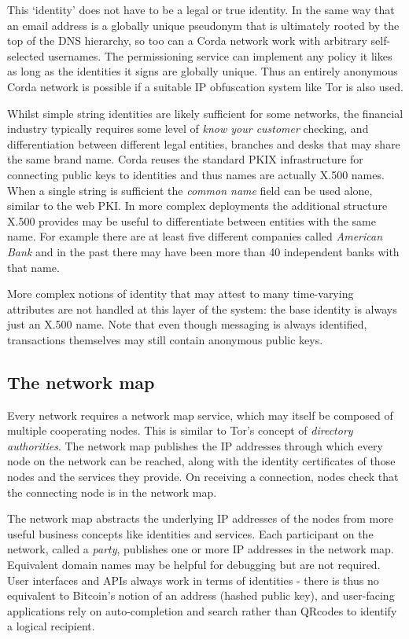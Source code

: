 \documentclass{article}
\begin{document}
This `identity' does not have to be a legal or true identity. In the same way that an email address is a globally
unique pseudonym that is ultimately rooted by the top of the DNS hierarchy, so too can a Corda network work with
arbitrary self-selected usernames. The permissioning service can implement any policy it likes as long as the
identities it signs are globally unique. Thus an entirely anonymous Corda network is possible if a suitable
IP obfuscation system like Tor is also used.

Whilst simple string identities are likely sufficient for some networks, the financial industry typically requires some
level of \emph{know your customer} checking, and differentiation between different legal entities, branches and desks
that may share the same brand name. Corda reuses the standard PKIX infrastructure for connecting public keys to
identities and thus names are actually X.500 names. When a single string is sufficient the \emph{common name} field can
be used alone, similar to the web PKI. In more complex deployments the additional structure X.500 provides may be useful
to differentiate between entities with the same name. For example there are at least five different companies called
\emph{American Bank} and in the past there may have been more than 40 independent banks with that name.

More complex notions of identity that may attest to many time-varying attributes are not handled at this layer of the
system: the base identity is always just an X.500 name. Note that even though messaging is always identified, transactions
themselves may still contain anonymous public keys.


\subsection{The network map}

Every network requires a network map service, which may itself be composed of multiple cooperating nodes. This is
similar to Tor's concept of \emph{directory authorities}. The network map publishes the IP addresses through which
every node on the network can be reached, along with the identity certificates of those nodes and the services they
provide. On receiving a connection, nodes check that the connecting node is in the network map.

The network map abstracts the underlying IP addresses of the nodes from more useful business concepts like identities
and services. Each participant on the network, called a \emph{party}, publishes one or more IP addresses in the
network map. Equivalent domain names may be helpful for debugging but are not required. User interfaces and APIs
always work in terms of identities - there is thus no equivalent to Bitcoin's notion of an address (hashed public key),
and user-facing applications rely on auto-completion and search rather than QRcodes to identify a logical recipient.
\end{document}
